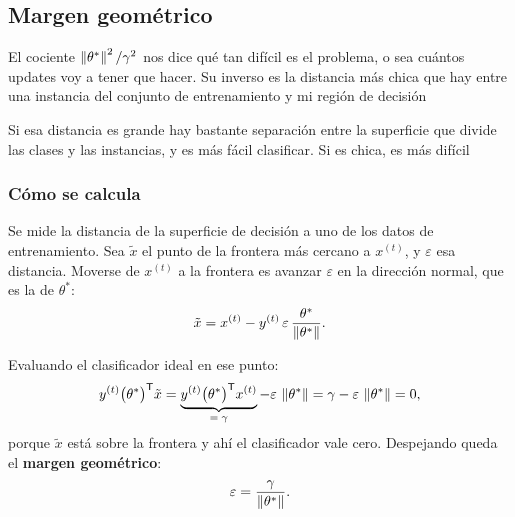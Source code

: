 \documentclass[11pt,letterpaper]{article}
\begin{document}

\subsection*{Margen geométrico}

El cociente $\left\lVert \theta^{*} \right\rVert^{2} / \gamma^{2}$ nos dice qué tan
difícil es el problema, o sea cuántos updates voy a tener que hacer.
Su inverso es la distancia más chica que hay entre una instancia del
conjunto de entrenamiento y mi región de decisión

Si esa distancia es grande hay bastante separación entre la
superficie que divide las clases y las instancias, y es más fácil
clasificar. Si es chica, es más difícil

\subsubsection*{Cómo se calcula}

Se mide la distancia de la superficie de decisión a uno de los datos
de entrenamiento. Sea $\tilde{x}$ el punto de la frontera más cercano
a $x^{(t)}$, y $\varepsilon$ esa distancia. Moverse de $x^{(t)}$ a la
frontera es avanzar $\varepsilon$ en la dirección normal, que es la
de $\theta^{*}$:
\[
    \tilde{x} = x^{(t)} - y^{(t)}\,\varepsilon\,
                \frac{\theta^{*}}{\left\lVert \theta^{*} \right\rVert} .
\]

Evaluando el clasificador ideal en ese punto:
\[
    y^{(t)} \big(\theta^{*}\big)^{\mathsf{T}} \tilde{x}
    = \underbrace{y^{(t)}
      \big(\theta^{*}\big)^{\mathsf{T}} x^{(t)}}_{=\;\gamma}
      - \varepsilon\,\left\lVert \theta^{*} \right\rVert
    = \gamma - \varepsilon\,\left\lVert \theta^{*} \right\rVert = 0 ,
\]
porque $\tilde{x}$ está sobre la frontera y ahí el clasificador vale
cero. Despejando queda el \textbf{margen geométrico}:
\[
    \varepsilon = \frac{\gamma}{\left\lVert \theta^{*} \right\rVert} .
\]
\end{document}
